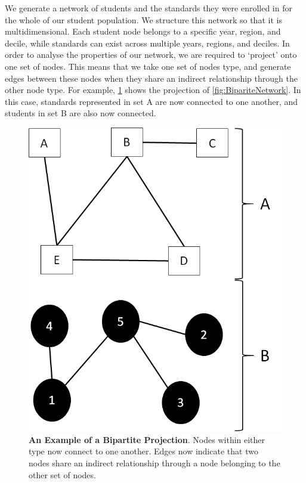 \documentclass[a4paper]{article}
\begin{document}
We generate a network of students and the standards they were enrolled in for the whole of our student population. We structure this network so that it is multidimensional. Each student node belongs to a specific year, region, and decile, while standards can exist across multiple years, regions, and deciles. In order to analyse the properties of our network, we are required to `project' onto one set of nodes. This means that we take one set of nodes type, and generate edges between these nodes when they share an indirect relationship through the other node type. For example, \ref{fig:BipartiteNetwork_Projection} shows the projection of \ref{fig:BipariteNetwork}. In this case, standards represented in set A are now connected to one another, and students in set B are also now connected. 
\begin{figure}
    \centering
    \includegraphics{Bipartite_Network_Projection.png}
    \caption{\textbf{An Example of a Bipartite Projection}. Nodes within either type now connect to one another. Edges now indicate that two nodes share an indirect relationship through a node belonging to the other set of nodes.}
    \label{fig:BipartiteNetwork_Projection}
\end{figure}
\end{document}
